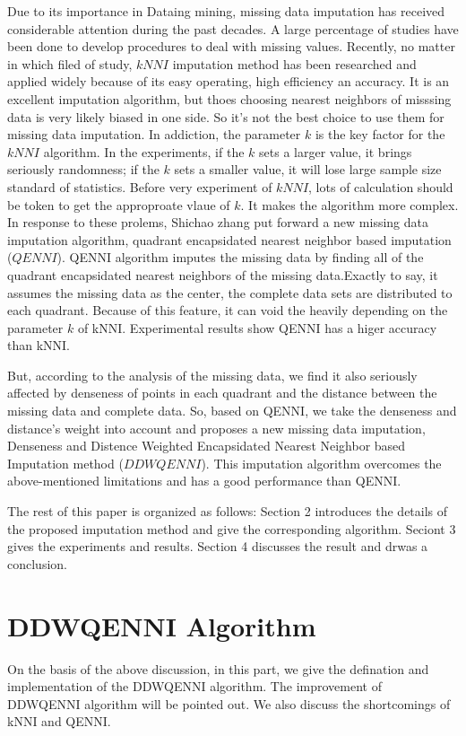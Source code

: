 \documentclass[print]{jicspack}
\begin{document}
Due to its importance in Dataing mining, missing data imputation has received considerable attention during the past decades. A large percentage of studies have been done to develop procedures to deal with missing values. Recently, no matter in which filed of study, $kNNI$ \cite{NumeApp} imputation method has been researched and applied widely because of its easy operating, high efficiency an accuracy. It is an excellent imputation algorithm, but thoes choosing nearest neighbors of misssing data is very likely biased in one side. So it's not the best choice to use them for missing data imputation. In addiction, the parameter $k$ is the key factor for the $kNNI$ algorithm. In the experiments, if the $k$ sets a larger value, it brings seriously randomness; if the $k$ sets a smaller value, it will lose large sample size standard of statistics. Before very experiment of $kNNI$, lots of calculation should be token to get the approproate vlaue of $k$. It makes the algorithm more complex. In response to these prolems, Shichao zhang \cite{NumeApp} put forward a new missing data imputation algorithm, quadrant encapsidated nearest neighbor based imputation ($QENNI$). QENNI algorithm imputes the missing data by finding all of the quadrant encapsidated nearest neighbors of the missing data.Exactly to say, it assumes the missing data as the center, the complete data sets are distributed to each quadrant. Because of this feature, it can void the heavily depending on the parameter $k$ of kNNI. Experimental results show QENNI has a higer accuracy than kNNI.

But, according to the analysis of the missing data, we find it also seriously affected by denseness of points in each quadrant and the distance between the missing data and complete data. So, based on QENNI,  we take the denseness and distance's weight into account and proposes a new missing data imputation, Denseness and Distence Weighted Encapsidated Nearest Neighbor based Imputation method ($DDWQENNI$). This imputation algorithm overcomes the above-mentioned limitations and has a good performance than QENNI.

The rest of this paper is organized as follows: Section 2 introduces the details of the proposed imputation method and give the corresponding algorithm. Seciont 3 gives the experiments and results. Section 4 discusses the result and drwas a conclusion.

\section{DDWQENNI Algorithm}
\label{sec:2.1}
On the basis of the above discussion, in this part, we give the defination and implementation of the DDWQENNI algorithm. The improvement of DDWQENNI algorithm will be pointed out. We also discuss the shortcomings of kNNI and QENNI.
\end{document}
